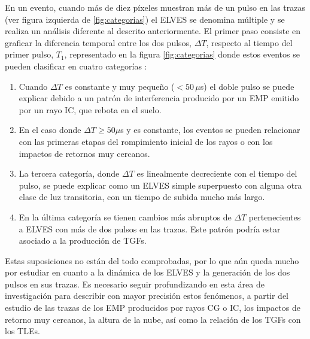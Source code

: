 \documentclass[12pt,oneside,openany,letter]{book}
\begin{document}
En un evento, cuando m\'as de diez p\'ixeles muestran m\'as de un pulso en las trazas (ver figura izquierda de \ref{fig:categorias}) el ELVES se denomina m\'ultiple y se realiza un an\'alisis diferente al descrito anteriormente. El primer paso consiste en graficar la diferencia temporal entre los dos pulsos, $\Delta T$, respecto al tiempo del primer pulso, $T_1$, representado en la figura \ref{fig:categorias} donde estos eventos se pueden clasificar en cuatro categor\'ias \cite{Mussa2019}:

\begin{enumerate}
    \item Cuando $\Delta T$ es constante y muy pequeño ($<50 \,\mu$s) el doble pulso se puede explicar debido a un patrón de interferencia producido por un EMP emitido por un rayo IC, que rebota en el suelo. 
    \item En el caso donde $\Delta T \geq 50\mu$s y es constante, los eventos se pueden relacionar con las primeras etapas del rompimiento inicial de los rayos o con los impactos de retornos muy cercanos. 
    \item La tercera categor\'ia, donde $\Delta T$ es linealmente decreciente con el tiempo del pulso, se puede explicar como un ELVES simple superpuesto con alguna otra clase de luz transitoria, con un tiempo de subida mucho más largo.
    \item En la \'ultima categor\'ia se tienen cambios m\'as abruptos de $\Delta T$ pertenecientes a ELVES con m\'as de dos pulsos en las trazas. Este patr\'on podr\'ia estar asociado a la producci\'on de TGFs.
    \end{enumerate}

Estas suposiciones no est\'an del todo comprobadas, por lo que a\'un queda mucho por estudiar en cuanto a la din\'amica de los ELVES y la generaci\'on de los dos pulsos en sus trazas. Es necesario seguir profundizando en esta \'area de investigaci\'on para describir con mayor precisión estos fen\'omenos, a partir del estudio de las trazas de los EMP producidos por rayos CG o IC, los impactos de retorno muy cercanos, la altura de la nube, as\'i como la relaci\'on de los TGFs con los TLEs. 





\end{document}
